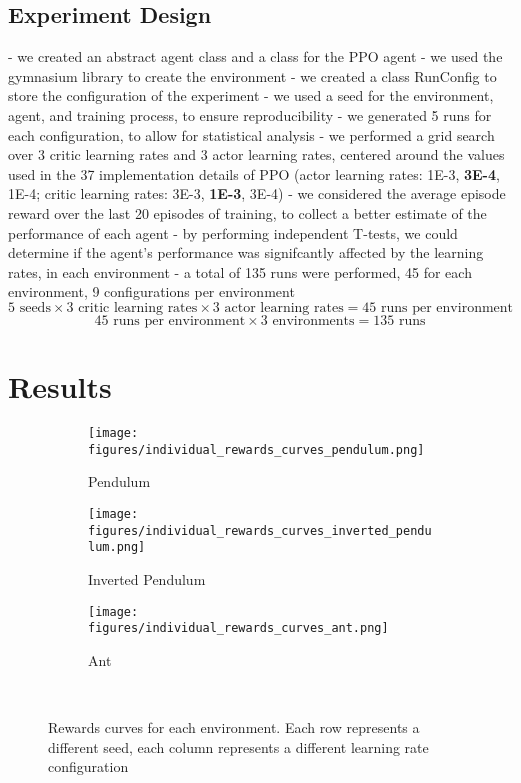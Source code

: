 \documentclass{article}
\begin{document}
\subsection{Experiment Design}
- we created an abstract agent class and a class for the PPO agent
- we used the gymnasium library to create the environment
- we created a class RunConfig to store the configuration of the experiment
- we used a seed for the environment, agent, and training process, to ensure reproducibility
- we generated 5 runs for each configuration, to allow for statistical analysis
- we performed a grid search over 3 critic learning rates and 3 actor learning rates, centered around the values used in the 37 implementation details of PPO \cite{shengyi2022the37implementation} (actor learning rates: 1E-3, \textbf{3E-4}, 1E-4; critic learning rates: 3E-3, \textbf{1E-3}, 3E-4)
- we considered the average episode reward over the last 20 episodes of training, to collect a better estimate of the performance of each agent
- by performing independent T-tests, we could determine if the agent's performance was signifcantly affected by the learning rates, in each environment
- a total of 135 runs were performed, 45 for each environment, 9 configurations per environment
$$5 \text{ seeds} \times 3 \text{ critic learning rates} \times 3 \text{ actor learning rates} = 45 \text{ runs per environment}$$
$$45 \text{ runs per environment} \times 3 \text{ environments} = 135 \text{ runs}$$

\section{Results}
\begin{figure}[ht]
    \centering
    \begin{subfigure}{0.48\textwidth}
        \centering
        \texttt{[image: figures/individual\_rewards\_curves\_pendulum.png]}
        \caption{Pendulum}
    \end{subfigure}
    \begin{subfigure}{0.48\textwidth}
        \centering
        \texttt{[image: figures/individual\_rewards\_curves\_inverted\_pendulum.png]}
        \caption{Inverted Pendulum}
    \end{subfigure}
    \begin{subfigure}{0.48\textwidth}
        \centering
        \texttt{[image: figures/individual\_rewards\_curves\_ant.png]}
        \caption{Ant}
    \end{subfigure}
    \captionsetup{justification=centering} \
    \caption{Rewards curves for each environment. Each row represents a different seed, each column represents a different learning rate configuration}
\end{figure}
\end{document}
